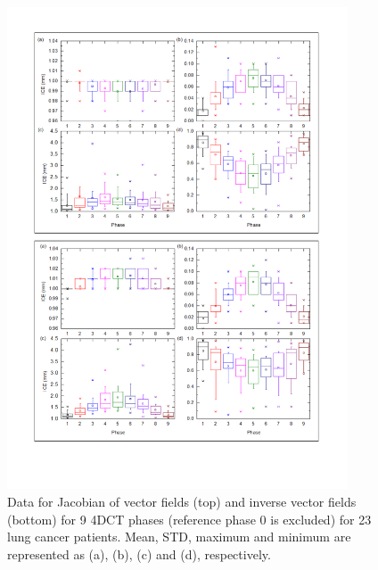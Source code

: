 \documentclass[type=dr, dr=rernat, accentcolor=tud7b,colorbacktitle, bigchapter, openright, twoside, 12pt ]{tudthesis}
\begin{document}
\begin{figure}[H]
	\begin{center}		
		\includegraphics[width=0.9\textwidth]{./Images/Jacobian_data.png}
		\caption{Data for Jacobian of vector fields (top) and inverse vector fields (bottom) for 9 4DCT phases (reference phase 0 is excluded) for 23 lung cancer patients. Mean, STD, maximum and minimum are represented as (a), (b), (c) and (d), respectively.}
		\label{jacobian_data}
	\end{center}
\end{figure}
\end{document}
